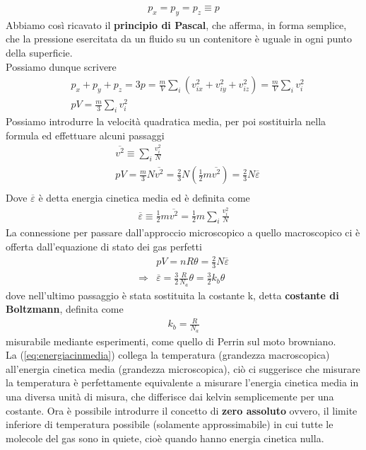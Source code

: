 \documentclass[10pt,a4paper]{article}
\begin{document}
\begin{align*} 
	p_x = p_y = p_z \equiv p
\end{align*} 
Abbiamo così ricavato il \textbf{principio di Pascal}, che afferma, in forma semplice, che la pressione esercitata da un fluido su un contenitore è uguale in ogni punto della superficie.\\
Possiamo dunque scrivere
\begin{align*} 
	&p_x+p_y+p_z = 3p = \frac{m}{V} \sum_i (v_{ix}^2+v_{iy}^2+v_{iz}^2) = \frac{m}{V} \sum_i v_i^2\\
	&pV = \frac{m}{3}\sum_i v_i^2
\end{align*} 
Possiamo introdurre la velocità quadratica media, per poi sostituirla nella formula ed effettuare alcuni passaggi
\begin{align*} 
	&\overline{v^2} \equiv \sum_i\frac{v_i^2}{N}\\
	&pV = \frac{m}{3}N \overline{v^2} = \frac{2}{3} N (\frac{1}{2}m \overline{v^2})=\frac{2}{3}N \overline{\varepsilon}\\
\end{align*} 
Dove $\overline{\varepsilon}$ è detta energia cinetica media ed è definita come
\begin{align*} 
	\overline{\varepsilon} \equiv \frac{1}{2} m \overline{v^2} = \frac{1}{2} m \sum_i\frac{v_i^2}{N}
\end{align*} 
La connessione per passare dall'approccio microscopico a quello macroscopico ci è offerta dall'equazione di stato dei gas perfetti
\begin{align}\label{eq:energiacinmedia}
	&pV = n R \theta = \frac{2}{3}N \overline{\varepsilon}\nonumber\\
	\Rightarrow & \overline{\varepsilon} = \frac{3}{2} \frac{R}{N_a} \theta = \frac{3}{2}k_b\theta
\end{align} 
dove nell'ultimo passaggio è stata sostituita la costante k, detta \textbf{costante di Boltzmann}, definita come
\begin{align*} 
k_b = \frac{R}{N_a}
\end{align*} 
misurabile mediante esperimenti, come quello di Perrin sul moto browniano.\\ 
La (\ref{eq:energiacinmedia}) collega la temperatura (grandezza macroscopica) all'energia cinetica media (grandezza microscopica), ciò ci suggerisce che misurare la temperatura è perfettamente equivalente a misurare l'energia cinetica media in una diversa unità di misura, che differisce dai kelvin semplicemente per una costante. Ora è possibile introdurre il concetto di \textbf{zero assoluto} ovvero, il limite inferiore di temperatura possibile (solamente approssimabile) in cui tutte le molecole del gas sono in quiete, cioè quando hanno energia cinetica nulla.
\end{document}
